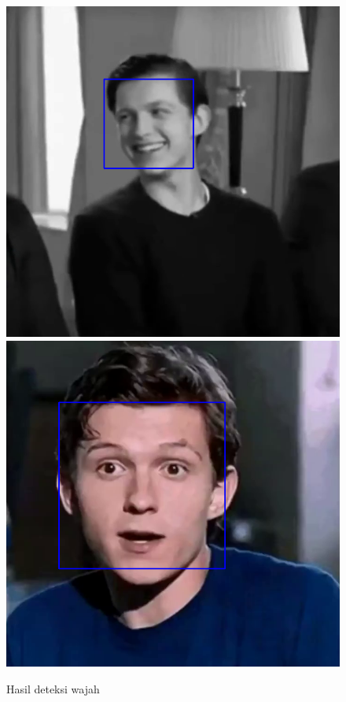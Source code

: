 \begin{figure}[h!]
    \centering
    \includegraphics[width=0.33\linewidth]{images/HASIL 1.PNG}
    \includegraphics[width=0.34\linewidth]{images/HASIL 2.PNG}
    \caption{Hasil deteksi wajah}
\end{figure}